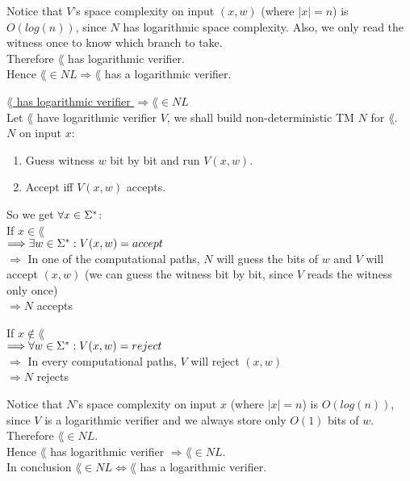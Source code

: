 Notice that $V$'s space complexity on input $(x, w)$ (where $|x|=n$) is $O(log(n))$,
since $N$ has logarithmic space complexity. Also, we only read the witness once to know which branch to take.\\
Therefore $\lang$ has logarithmic verifier. \\
Hence $\lang \in NL \Rightarrow \lang$ has a logarithmic verifier. \\

\pagebreak

\underline{$\lang$ has logarithmic verifier $\Rightarrow \lang \in NL$} \\
Let $\lang$ have logarithmic verifier $V$, we shall build non-deterministic TM $N$ for $\lang$. \\
$N$ on input $x$:
\begin{enumerate}[1., itemsep=5pt]
    \item Guess witness $w$ bit by bit and run $V(x,w)$.
    \item Accept iff $V(x,w)$ accepts.
\end{enumerate}

So we get $\forall x \in \Sigma^*$: \\
If $x \in \lang$ \\
$\Longrightarrow \exists w \in \Sigma^* : V (x, w) = accept$ \\
$\Longrightarrow$ In one of the computational paths, $N$ will guess the bits of $w$ and $V$ will accept $(x, w)$
(we can guess the witness bit by bit, since $V$ reads the witness only once) \\
$\Longrightarrow N$ accepts

If $x \notin \lang$ \\
$\Longrightarrow \forall w \in \Sigma^* : V (x, w) = reject$ \\
$\Longrightarrow$ In every computational paths, $V$ will reject $(x, w)$ \\
$\Longrightarrow N$ rejects

Notice that $N$'s space complexity on input $x$ (where $|x|=n$) is $O(log(n))$,
since $V$ is a logarithmic verifier and we always store only $O(1)$ bits of $w$. \\

Therefore $\lang \in NL$. \\
Hence $\lang$ has logarithmic verifier $\Rightarrow \lang \in NL$. \\
In conclusion $\lang \in NL \iff \lang$ has a logarithmic verifier.
